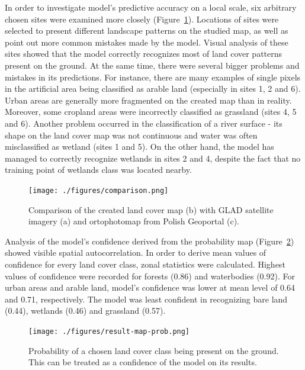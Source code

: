 \documentclass{amuthesis}
\begin{document}
In order to investigate model's predictive accuracy on a local scale,
six arbitrary chosen sites were examined more closely
(Figure~\ref{fig-rycina10}). Locations of sites were selected to present
different landscape patterns on the studied map, as well as point out
more common mistakes made by the model. Visual analysis of these sites
showed that the model correctly recognizes most of land cover patterns
present on the ground. At the same time, there were several bigger
problems and mistakes in its predictions. For instance, there are many
examples of single pixels in the artificial area being classified as
arable land (especially in sites 1, 2 and 6). Urban areas are generally
more fragmented on the created map than in reality. Moreover, some
cropland areas were incorrectly classified as grassland (sites 4, 5 and
6). Another problem occurred in the classification of a river surface -
its shape on the land cover map was not continuous and water was often
misclassified as wetland (sites 1 and 5). On the other hand, the model
has managed to correctly recognize wetlands in sites 2 and 4, despite
the fact that no training point of wetlands class was located nearby.

\begin{figure}[H]

{\centering \texttt{[image: ./figures/comparison.png]}

}

\caption{\label{fig-rycina10}Comparison of the created land cover map
(b) with GLAD satellite imagery (a) and ortophotomap from Polish
Geoportal (c).}

\end{figure}

Analysis of the model's confidence derived from the probability map
(Figure~\ref{fig-rycina11}) showed visible spatial autocorrelation. In
order to derive mean values of confidence for every land cover class,
zonal statistics were calculated. Highest values of confidence were
recorded for forests (0.86) and waterbodies (0.92). For urban areas and
arable land, model's confidence was lower at mean level of 0.64 and
0.71, respectively. The model was least confident in recognizing bare
land (0.44), wetlands (0.46) and grassland (0.57).

\begin{figure}[H]

{\centering \texttt{[image: ./figures/result-map-prob.png]}

}

\caption{\label{fig-rycina11}Probability of a chosen land cover class
being present on the ground. This can be treated as a confidence of the
model on its results.}

\end{figure}
\end{document}
